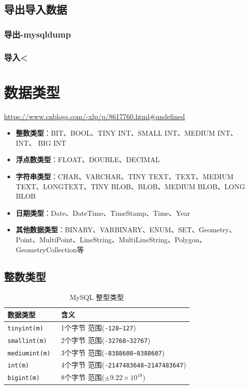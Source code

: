 \documentclass[UTF8,a4paper,12pt]{ctexbook}
\begin{document}
	
	\section{导出导入数据}
		\subsection{导出-mysqldump}
	
	
		\subsection{导入<}
		
\chapter{数据类型}
	\url{https://www.cnblogs.com/-xlp/p/8617760.html#undefined}
	
	\begin{itemize}
		\item \textbf{整数类型}：BIT、BOOL、TINY INT、SMALL INT、MEDIUM INT、 INT、 BIG INT
		\item \textbf{浮点数类型}：FLOAT、DOUBLE、DECIMAL
		\item \textbf{字符串类型}：CHAR、VARCHAR、TINY TEXT、TEXT、MEDIUM TEXT、LONGTEXT、TINY BLOB、BLOB、MEDIUM BLOB、LONG BLOB
		\item \textbf{日期类型}：Date、DateTime、TimeStamp、Time、Year
		\item \textbf{其他数据类型}：BINARY、VARBINARY、ENUM、SET、Geometry、Point、MultiPoint、LineString、MultiLineString、Polygon、GeometryCollection等
	\end{itemize}

	\section{整数类型}
		\begin{table}[H]
			\centering
			\caption{MySQL 整型类型}
			\begin{tabular}{p{5cm}<{\centering}|p{11cm}<{\centering}}
				\toprule
					数据类型  &  含义\\
				\midrule
					\verb|tinyint(m) | & 1个字节 范围(\verb|-128~127|)\\
					\verb|smallint(m) | & 2个字节 范围(\verb|-32768~32767|)\\
					\verb|mediumint(m) | & 3个字节 范围(\verb|-8388608~8388607|)\\
					\verb|int(m) | & 4个字节 范围(\verb|-2147483648~2147483647|)\\
					\verb|bigint(m) | & 8个字节 范围($\pm 9.22\times 10^{18} $)\\
				\bottomrule
			\end{tabular}
		\end{table}
		
\end{document}
